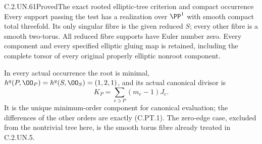 \begin{statement}{C.2.UN.61}{Proved}{The exact rooted elliptic-tree criterion and compact occurrence}
Every support passing the test has a realization over $\PP^1$
with smooth compact total threefold. Its only singular fibre
is the given reduced $S$; every other fibre is a smooth
two-torus. All reduced fibre supports have Euler number zero.
Every component and every specified elliptic gluing map is
retained, including the complete torsor of every original
properly elliptic nonroot component.

In every actual occurrence the root is minimal,
$h^q(P,\OO_P)=h^q(S,\OO_S)=(1,2,1)$, and its actual canonical
divisor is
\[
                 K_P=\sum_{e\ni P}(m_e-1)J_e.
                 \tag{C.PT.2}
\]
It is the unique minimum-order component for canonical evaluation;
the differences of the other orders are exactly (C.PT.1).
The zero-edge case, excluded from the nontrivial tree here,
is the smooth torus fibre already treated in C.2.UN.5.
\end{statement}

